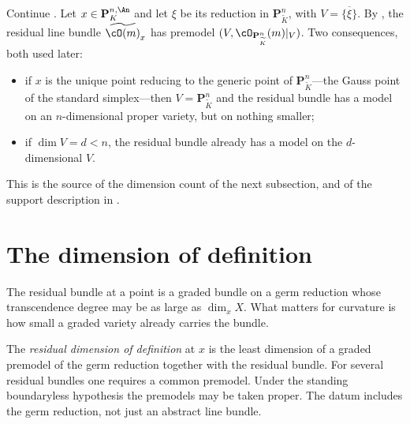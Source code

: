 \begin{example}
\label{ex:ch17-residual-weil}
Continue .  Let $x\in\mathbf P^{n,\An}_K$ and
let $\xi$ be its reduction in $\mathbf P^n_{\widetilde K}$, with
$V=\overline{\{\xi\}}$.  By , the residual
line bundle $\widetilde{\cO(m)}_x$ has premodel
$(V,\cO_{\mathbf P^n_{\widetilde K}}(m)|_V)$.  Two consequences, both used
later:
\begin{itemize}
\item if $x$ is the unique point reducing to the generic point of
 $\mathbf P^n_{\widetilde K}$---the Gauss point of the standard
 simplex---then $V=\mathbf P^n_{\widetilde K}$ and the residual bundle has
 a model on an $n$-dimensional proper variety, but on nothing smaller;
\item if $\dim V=d<n$, the residual bundle already has a model on the
 $d$-dimensional $V$.
\end{itemize}
This is the source of the dimension count of the next subsection, and of the
support description in .
\end{example}

\section{The dimension of definition}
\label{sec:ch17-dimdef}

The residual bundle at a point is a graded bundle on a germ reduction whose
transcendence degree may be as large as $\dim_xX$.  What matters for
curvature is how small a graded variety already carries the bundle.

\begin{definition}
\label{def:ch17-dimension-definition}
The \emph{residual dimension of definition} at $x$ is the least
dimension of a graded premodel of the germ reduction together with the
residual bundle.  For several residual bundles one requires a common
premodel.  Under the standing boundaryless hypothesis the premodels may
be taken proper.  The datum includes the germ reduction, not just an
abstract line bundle.
\end{definition}

